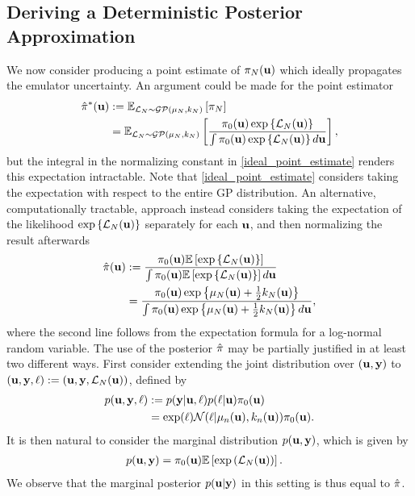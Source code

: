 \documentclass[12pt]{article}
\begin{document}
\subsection{Deriving a Deterministic Posterior Approximation}
We now consider producing a point estimate of $\postDens_{\Ndesign}(\bpar)$ which ideally propagates the emulator uncertainty. An argument could 
be made for the point estimator 
\begin{align}
\hat{\postDens}^*(\bpar) 
&:= \E_{\llik_{\Ndesign} \sim \GP(\GPMeanPred[\Ndesign], \GPKerPred[\Ndesign])} \left[ \postDens_{\Ndesign} \right] \nonumber \\
&= \E_{\llik_{\Ndesign} \sim \GP(\GPMeanPred[\Ndesign], \GPKerPred[\Ndesign])} \left[ \frac{\priorDens(\bpar) \exp\left\{\llik_{\Ndesign}(\bpar) \right\}}{\int \priorDens(\bpar) \exp\left\{\llik_{\Ndesign}(\bpar) \right\} d\bpar} \right] \label{ideal_point_estimate},
\end{align}
but the integral in the normalizing constant in \ref{ideal_point_estimate} renders this expectation intractable. Note that \ref{ideal_point_estimate} considers taking the 
expectation with respect to the entire GP distribution. An alternative, computationally tractable, approach instead considers taking the expectation of the 
likelihood $\exp\left\{\llik_{\Ndesign}(\bpar)\right\}$ separately for each $\bpar$, and then normalizing the result afterwards
\begin{align}
\hat{\postDens}(\bpar) 
&:= \frac{\priorDens(\bpar) \E\left[\exp\left\{\llik_{\Ndesign}(\bpar)\right\} \right]}{\int \priorDens(\bpar) \E\left[\exp\left\{\llik_{\Ndesign}(\bpar)\right\} \right] d\bpar} \\
&= \frac{\priorDens(\bpar) \exp\left\{\GPMeanPred[\Ndesign](\bpar) + \frac{1}{2}\GPKerPred[\Ndesign](\bpar) \right\}}{\int \priorDens(\bpar) \exp\left\{\GPMeanPred[\Ndesign](\bpar) + \frac{1}{2}\GPKerPred[\Ndesign](\bpar) \right\} d\bpar}, \label{point_estimate}
\end{align}
where the second line follows from the expectation formula for a log-normal random variable. The use of the posterior $\hat{\postDens}$ may be partially justified in at least two different ways. 
First consider extending the joint distribution over $(\bpar, \dataOut)$ to $(\bpar, \dataOut, \ell) := (\bpar, \dataOut, \llik_{\Ndesign}(\bpar))$, defined by 
\begin{align*}
p(\bpar, \dataOut, \ell) 
&:= p(\dataOut|\bpar, \ell) p(\ell|\bpar) \priorDens(\bpar) \\
&= \exp(\ell) \Gaussian(\ell | \GPMeanPred(\bpar), \GPKerPred(\bpar)) \priorDens(\bpar).
\end{align*}
It is then natural to consider the marginal distribution $p(\bpar, \dataOut)$, which is given by 
\begin{align}
p(\bpar, \dataOut) &= \priorDens(\bpar) \E\left[\exp\left(\llik_{\Ndesign}(\bpar)\right) \right].
\end{align}
We observe that the marginal posterior $p(\bpar|\dataOut)$ in this setting is thus equal to $\hat{\postDens}$. 
\end{document}
